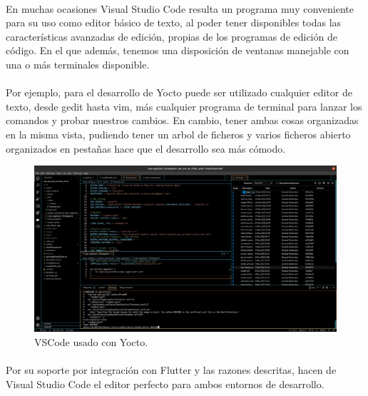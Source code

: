 \paragraph{}En muchas ocasiones Visual Studio Code resulta un programa muy conveniente
para su uso como editor básico de texto, al poder tener disponibles todas las características
avanzadas de edición, propias de los programas de edición de código. En el que además,
tenemos una disposición de ventanas manejable con una o más terminales disponible.

\paragraph{}Por ejemplo, para el desarrollo de Yocto puede ser utilizado cualquier editor
de texto, desde gedit hasta vim, más cualquier programa de terminal para lanzar los
comandos y probar nuestros cambios. En cambio, tener ambas cosas organizadas en la misma
vista, pudiendo tener un arbol de ficheros y varios ficheros abierto organizados en pestañas
hace que el desarrollo sea más cómodo.


\begin{figure}[H]
	\centering
	\includegraphics[width=0.90\linewidth]{imgs/vscode-perspective}
	\caption[VSCode yocto]{VSCode usado con Yocto.}
	\label{fig:vscode-perpective}
\end{figure}

\paragraph{}Por su soporte por integración con Flutter y las razones descritas, hacen
de Visual Studio Code el editor perfecto para ambos entornos de desarrollo.

